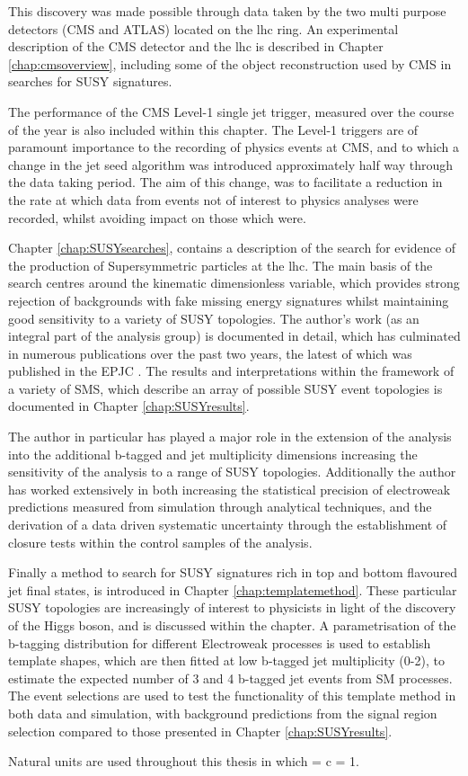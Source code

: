 This discovery was made possible through data taken by the two multi purpose detectors (\acf{CMS} and \ac{ATLAS}) located on the \ac{lhc} ring. An experimental description of the \ac{CMS} detector and the \ac{lhc} is described in Chapter \ref{chap:cmsoverview}, including some of the object reconstruction used by \ac{CMS} in searches for \ac{SUSY} signatures. 

The performance of the \ac{CMS} Level-1 single jet trigger, measured over the course of the year is also included within this chapter. The Level-1 triggers are of paramount importance to the recording of physics events at \ac{CMS}, and to which a change in the jet seed algorithm was introduced approximately half way through the data taking period. The aim of this change, was to facilitate a reduction in the rate at which data from events not of interest to physics analyses were recorded, whilst avoiding impact on those which were.

Chapter \ref{chap:SUSYsearches}, contains a description of the search for evidence of the production of Supersymmetric particles at the \ac{lhc}. The main basis of the search centres around the kinematic dimensionless \alphat variable, which provides strong rejection of backgrounds with fake missing energy signatures whilst maintaining good sensitivity to a variety of \ac{SUSY} topologies. The author's work (as an integral part of the analysis group) is documented in detail, which has culminated in numerous publications over the past two years, the latest of which was published in the \acf{EPJC} \cite{ra1_epjc}.  The results and interpretations within the framework of a variety of \acf{SMS}, which describe an array of possible \ac{SUSY} event topologies is documented in Chapter \ref{chap:SUSYresults}. 

The author in particular has played a major role in the extension of the \alphat analysis into the additional b-tagged and jet multiplicity dimensions increasing the sensitivity of the analysis to a range of \ac{SUSY} topologies. Additionally the author has worked extensively in both increasing the statistical precision of electroweak predictions measured from simulation through analytical techniques, and the derivation of a data driven systematic uncertainty through the establishment of closure tests within the control samples of the analysis. 

Finally a method to search for \ac{SUSY} signatures rich in top and bottom flavoured jet final states, is introduced in Chapter \ref{chap:templatemethod}. These particular \ac{SUSY} topologies are increasingly of interest to physicists in light of the discovery of the Higgs boson, and is discussed within the chapter. A parametrisation of the b-tagging distribution for different Electroweak processes is used to establish template shapes, which are then fitted at low b-tagged jet multiplicity (0-2),  to estimate the expected number of 3 and 4 b-tagged jet events from \ac{SM} processes. The \alphat event selections are used to test the functionality of this template method in both data and simulation, with background predictions from the signal region selection compared to those presented in Chapter \ref{chap:SUSYresults}. 


Natural units are used throughout this thesis in which \hbarred = c = 1.
